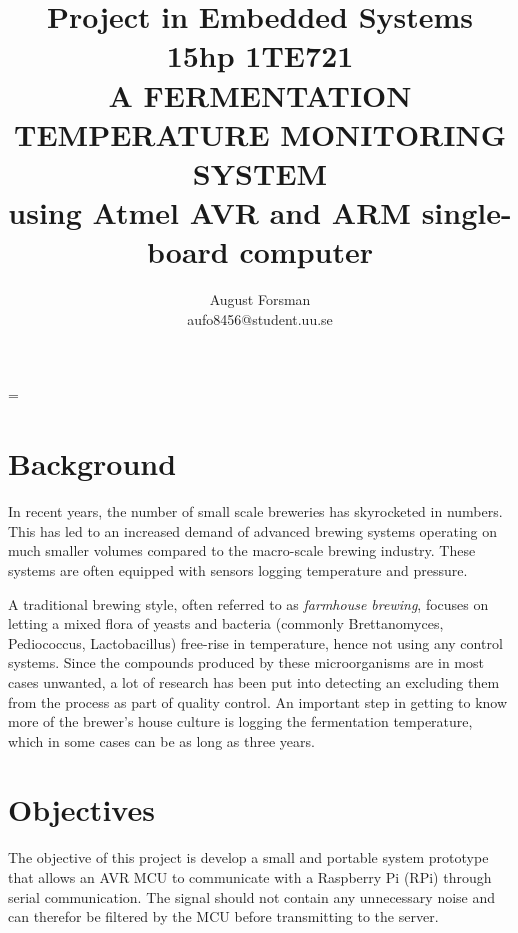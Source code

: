 \documentclass[10pt]{article}
\title{\renewcommand{\baselinestretch}{1.17}\normalsize\bf%
  Project in Embedded Systems 15hp 1TE721\\
  \vspace{2mm}
  \uppercase{A fermentation temperature monitoring system}\\
  using Atmel AVR and ARM single-board computer\\
}
\author{%
  August Forsman\\
  \small aufo8456@student.uu.se
}
\begin{document}
\date{}

\maketitle

\vspace{-0.5cm}



\baselineskip=\normalbaselineskip

\section*{Background}%
\label{sec:background}
In recent years, the number of small scale breweries has skyrocketed in numbers. This has led to an increased demand of advanced brewing systems operating on much smaller volumes compared to the macro-scale brewing industry. These systems are often equipped with sensors logging temperature and pressure.

A traditional brewing style, often referred to as 
\textit{farmhouse brewing}, focuses on letting a mixed flora of yeasts and bacteria (commonly Brettanomyces, Pediococcus, Lactobacillus) free-rise in temperature, hence not using any control systems. Since the compounds produced by these microorganisms are in most cases unwanted, a lot of research has been put into detecting an excluding them from the process as part of quality control. An important step in getting to know more of the brewer's house culture is logging the fermentation temperature, which in some cases can be as long as three years.


\section*{Objectives}%
\label{sec:objectives}
The objective of this project is develop a small and portable system prototype that allows an AVR MCU to communicate with a Raspberry Pi (RPi) through serial communication. The signal should not contain any unnecessary noise and can therefor be filtered by the MCU before transmitting to the server.
\end{document}
